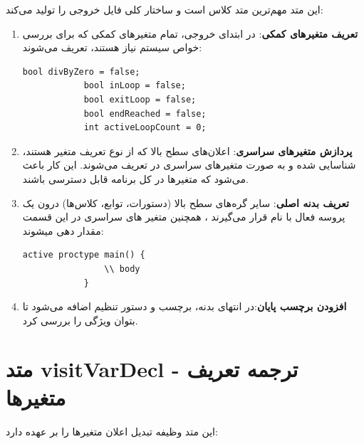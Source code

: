 \documentclass[12pt]{report}
\begin{document}
	این متد مهم‌ترین متد کلاس است و ساختار کلی فایل خروجی را تولید می‌کند:
	
	\begin{enumerate}
		\item \textbf{تعریف متغیرهای کمکی}: در ابتدای خروجی، تمام متغیرهای کمکی که برای بررسی خواص سیستم نیاز هستند، تعریف می‌شوند:
		\setLTR
		\begin{lstlisting}[language=Promela]
			bool divByZero = false;
			bool inLoop = false;
			bool exitLoop = false;
			bool endReached = false;
			int activeLoopCount = 0;
		\end{lstlisting}
		\setRTL
		
		\item \textbf{پردازش متغیرهای سراسری}: اعلان‌های سطح بالا که از نوع تعریف متغیر هستند، شناسایی شده و به صورت متغیرهای سراسری در  تعریف می‌شوند. این کار باعث می‌شود که متغیرها در کل برنامه قابل دسترسی باشند.
		
		\item \textbf{تعریف بدنه اصلی}: سایر گره‌های سطح بالا (دستورات، توابع، کلاس‌ها) درون یک پروسه فعال با نام  قرار می‌گیرند ، همچنین متغیر های سراسری در این قسمت مقدار دهی میشوند:
		\setLTR
		\begin{lstlisting}[language=Promela]
			active proctype main() {
				\\ body
			}
		\end{lstlisting}
		\setRTL
		
		\item \textbf{افزودن برچسب پایان}:\newline در انتهای بدنه، برچسب  و دستور تنظیم  اضافه می‌شود تا بتوان ویژگی  را بررسی کرد.
	\end{enumerate}
	
	\section{متد visitVarDecl - ترجمه تعریف متغیرها}
	
	این متد وظیفه تبدیل اعلان متغیرها را بر عهده دارد:
	
\end{document}
